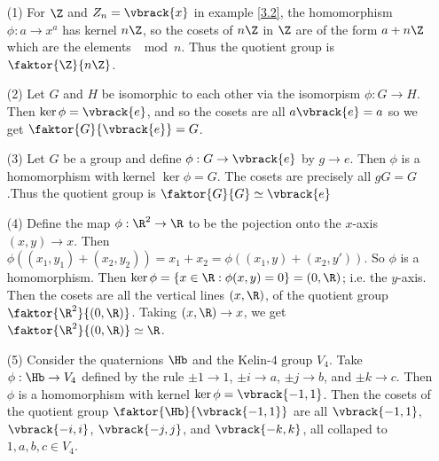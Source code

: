\begin{example}\label{3.2}
    \begin{enumerate}
        \item[(1)] For $\Z$ and  $Z_n=\vbrack{x}$ in example \ref {3.2}, the
            homomorphism $\phi:a \rightarrow x^a$ has kernel $n\Z$, so the
            cosets of  $n\Z$ in  $\Z$ are of the form  $a+n\Z$ which are the
            elements $\mod{n}$. Thus the quotient group is $\faktor{\Z}{n\Z}$.

        \item[(2)] Let $G$ and  $H$ be isomorphic to each other via the
            isomorpism  $\phi:G \rightarrow H$. Then $\ker{\phi}=\vbrack{e}$,
            and so the cosets are all $a\vbrack{e}=a$ so we get
            $\faktor{G}{\vbrack{e}}=G$.

        \item[(3)] Let $G$ be a group and define  $\phi:G \rightarrow
            \vbrack{e}$ by $g \rightarrow e$. Then $\phi$ is a homomorphism with
             kernel $\ker{\phi}=G$. The cosets are precisely all $gG=G$.Thus
             the quotient group is $\faktor{G}{G} \simeq \vbrack{e}$

         \item[(4)] Define the map $\phi:\R^2 \rightarrow \R$ to be the
             pojection onto the $x$-axis $(x,y) \rightarrow x$. Then
             $\phi((x_1,y_1)+(x_2,y_2))=x_1+x_2=\phi((x_1,y)+(x_2,y'))$. So
             $\phi$ is a homomorphism. Then $\ker{\phi}=\{x \in \R :
             \phi(x,y)=0\}=(0,\R)$; i.e. the $y$-axis. Then the cosets are all
             the vertical lines $(x,\R)$, of the quotient group
             $\faktor{\R^2}{(0,\R)}$. Taking $(x,\R) \rightarrow x$, we get
             $\faktor{\R^2}{(0,\R)} \simeq \R$.

         \item[(5)] Consider the quaternions $\Hb$ and the Kelin-$4$ group  $V_4$.
             Take  $\phi:\Hb \rightarrow V_4$ defined by the rule $\pm 1
             \rightarrow 1$, $\pm i \rightarrow a$, $\pm j \rightarrow b$, and
              $\pm k \rightarrow c$. Then  $\phi$ is a homomorphism with kernel
               $\ker{\phi}=\vbrack{-1,1}$. Then the cosets of the quotient group
                $\faktor{\Hb}{\vbrack{-1,1}}$ are all $\vbrack{-1,1}$,
                $\vbrack{-i,i}$, $\vbrack{-j,j}$, and $\vbrack{-k,k}$, all
                collaped to  $1,a,b,c \in V_4$.
    \end{enumerate}
\end{example}
